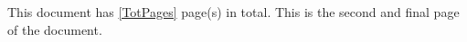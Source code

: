 \documentclass{article}
\begin{document}
This document has \ref{TotPages} page(s) in total.
\newpage
This is the second and final page of the document.
\end{document}

